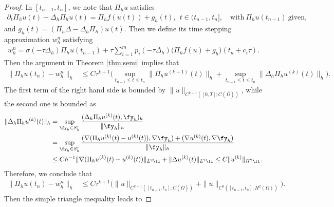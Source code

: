 \begin{proof}
In $[t_{n-1}, t_{n}]$, we note that $\Pi_h u$ satisfies
\begin{align*}
 \partial_t \Pi_h u(t) - \Delta_h \Pi_h u(t) = \Pi_h f(u(t)) + g_h(t),~~t\in(t_{n-1}, t_{n}], \quad\text{with}~ \Pi_h u(t_{n-1}) ~\text{given},
\end{align*}
and $g_h(t) = ( \Pi_h \Delta - \Delta_h \Pi_h) u(t)$.
Then we define its time stepping approximation $w_h^n$ satisfying
\begin{align*}
 w_h^n = \sigma(-\tau\Delta_h) \Pi_h u(t_{n-1}) + \tau\sum_{i=1}^m p_i(-\tau\Delta_h) \Big(\Pi_h f(u) + g_h\Big)(t_n+c_i\tau).
\end{align*}
Then the argument in Theorem \ref{thm:semi} implies that
\begin{equation*}%
\begin{split}
\| \Pi_h u(t_n) - w_h^n  \|_h &\le C\tau^{k+1} \Big(\sup_{t_{n-1}\le t\le t_n}\|  \Pi_h u^{(k+1)}(t)  \|_h + \sup_{t_{n-1}\le t\le t_n} \|  \Delta_h \Pi_h u^{(k)}(t)  \|_h\Big).
\end{split}
\end{equation*}
The first term of the right hand side is bounded by $\| u \|_{C^{k+1}([0,T]; C(\bar\Omega))}$, while the second one is bounded  as
\begin{align*}
\|  \Delta_h \Pi_h u^{(k)}(t)  \|_h &= \sup_{\fy_h\in S_h^r}\frac{( \Delta_h \Pi_h u^{(k)}(t), \fy_h)_h}{ \|\fy_h\|_h}\\
&=\sup_{\fy_h\in S_h^r}\frac{( \nabla (\Pi_h u^{(k)}(t) - u^{(k)}(t)),\nabla \fy_h) + ( \nabla  u^{(k)}(t),\nabla \fy_h)}{ \|\fy_h\|_h}\\
& \le C h^{-1} \| \nabla (\Pi_h u^{(k)}(t) - u^{(k)}(t))  \|_{L^2\II} + \|  \Delta  u^{(k)}(t) \|_{L^2\II}\le C \|  u^{(k)} \|_{H^2\II}.
\end{align*}
Therefore, we conclude that
\begin{equation*}
\begin{split}
\| \Pi_h u(t_n) - w_h^n  \|_h &\le C\tau^{k+1} \Big( \| u \|_{C^{k+1}([t_{n-1},t_{n}]; C(\bar\Omega))} +   \|  u \|_{C^{k}([t_{n-1},t_{n}]; H^2(\Omega))}\Big).
\end{split}
\end{equation*}
Then the simple triangle inequality leads to

\end{proof}
